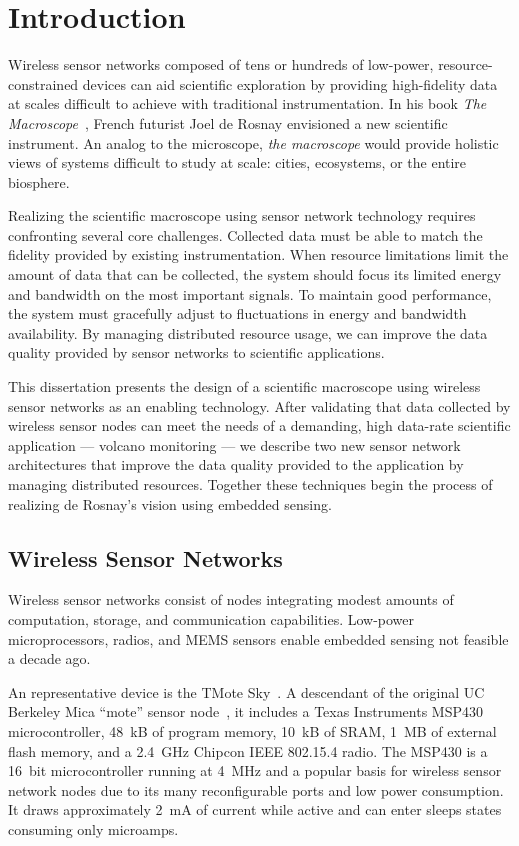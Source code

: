 \chapter{Introduction}
\label{chap-introduction}

Wireless sensor networks composed of tens or hundreds of low-power,
resource-constrained devices can aid scientific exploration by providing
high-fidelity data at scales difficult to achieve with traditional
instrumentation. In his book \textit{The Macroscope}~\cite{rosnay79}, French
futurist Joel de Rosnay envisioned a new scientific instrument. An analog to
the microscope, \textit{the macroscope} would provide holistic views of
systems difficult to study at scale: cities, ecosystems, or the entire
biosphere.

Realizing the scientific macroscope using sensor network technology requires
confronting several core challenges. Collected data must be able to match the
fidelity provided by existing instrumentation. When resource limitations
limit the amount of data that can be collected, the system should focus its
limited energy and bandwidth on the most important signals. To maintain good
performance, the system must gracefully adjust to fluctuations in energy and
bandwidth availability. By managing distributed resource usage, we can
improve the data quality provided by sensor networks to scientific
applications.

\clearpage

This dissertation presents the design of a scientific macroscope using
wireless sensor networks as an enabling technology. After validating that
data collected by wireless sensor nodes can meet the needs of a demanding,
high data-rate scientific application --- volcano monitoring --- we describe
two new sensor network architectures that improve the data quality provided
to the application by managing distributed resources. Together these
techniques begin the process of realizing de Rosnay's vision using embedded
sensing.

\section{Wireless Sensor Networks}

Wireless sensor networks consist of nodes integrating modest amounts of
computation, storage, and communication capabilities. Low-power
microprocessors, radios, and MEMS sensors enable embedded sensing not
feasible a decade ago.

An representative device is the TMote Sky~\cite{moteiv}. A descendant of the
original UC Berkeley Mica ``mote'' sensor node~\cite{hill-thesis}, it
includes a Texas Instruments MSP430 microcontroller, 48~kB of program memory,
10~kB of SRAM, 1~MB of external flash memory, and a 2.4~GHz Chipcon IEEE
802.15.4 radio. The MSP430 is a 16~bit microcontroller running at 4~MHz and a
popular basis for wireless sensor network nodes due to its many
reconfigurable ports and low power consumption. It draws approximately 2~mA
of current while active and can enter sleeps states consuming only microamps.

